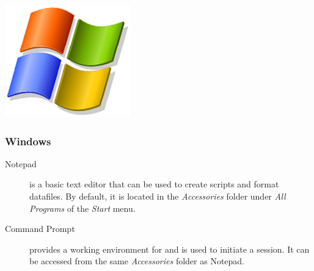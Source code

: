 \begin{flushleft}
	\begin{minipage}[c]{0.074\textwidth}
	   	\includegraphics[width=\textwidth]{figures/figLogoWindows.jpg}
	\end{minipage}%
	\quad
	\begin{minipage}[t]{0.88\textwidth}
		   	\subsubsection{Windows}
	\end{minipage}
		\begin{description}
			\item[Notepad] is a basic text editor that can be used to create \poy
			scripts and format datafiles. By default, it is located in the \emph{Accessories}
			folder under \emph{All Programs} of the \emph{Start} menu.
			\item[Command Prompt] provides a working environment for
			\poy and is used to initiate a \poy session.
		It can be accessed from the same \emph{Accessories} folder as Notepad.
		\end{description}


\end{flushleft}
